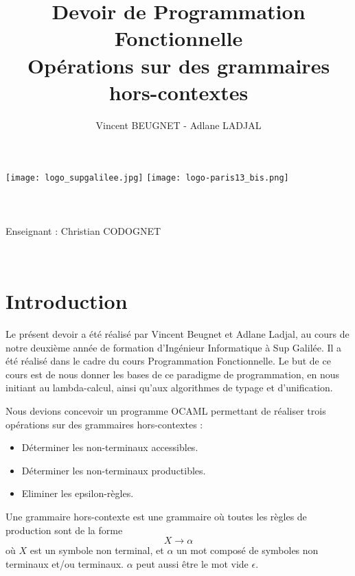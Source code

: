 \documentclass[11pt,a4paper]{article}
\author{Vincent BEUGNET - Adlane LADJAL}
\title{Devoir de Programmation Fonctionnelle \\ Opérations sur des grammaires hors-contextes}
\begin{document}
\makeatletter
\begin{titlepage}
	\centering
	\texttt{[image: logo\_supgalilee.jpg]}
	\hfill
	\texttt{[image: logo-paris13\_bis.png]} \\
    \vspace{5cm}
       {\LARGE \textbf{\@title}} \\
    \vspace{2em}
        {\large \@author }\\
    \vspace{1em}
        {\textit{\@date}} \\
    \vspace{2em}
    	\vspace{2em}
    		{Enseignant : Christian CODOGNET} \\
    \vfill
\end{titlepage}


\newpage
~
\newpage

\renewcommand{\contentsname}{Sommaire}
\tableofcontents

\newpage

\pagestyle{plain}

\section{Introduction}
Le présent devoir a été réalisé par Vincent Beugnet 
et Adlane Ladjal, au cours de notre deuxième année 
de formation d'Ingénieur Informatique à  Sup Galilée.
Il a été réalisé dans le cadre du cours Programmation
Fonctionnelle. Le but de ce cours est de nous donner 
les bases de ce paradigme de programmation, en nous
initiant au lambda-calcul, ainsi qu'aux algorithmes de 
typage et d'unification.

Nous devions concevoir un programme OCAML permettant de
réaliser trois opérations sur des grammaires hors-contextes : 

\begin{itemize}
    \item Déterminer les non-terminaux accessibles.
    \item Déterminer les non-terminaux productibles.
    \item Eliminer les epsilon-règles.
\end{itemize}

Une grammaire hors-contexte est une grammaire où toutes les
règles de production sont de la forme \[ X \rightarrow \alpha \]
où $X$ est un symbole non terminal, et $\alpha$ un mot composé
de symboles non terminaux et/ou terminaux. $\alpha$ peut aussi
être le mot vide $\epsilon$.
\newpage
\end{document}
